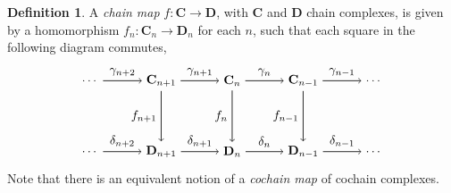 \documentclass[11.5pt, twoside, a4paper, titlepage]{report}
\theoremstyle{definition}
\newtheorem{mydef}{Definition}[section]
\theoremstyle{plain}
\begin{document}
\begin{mydef}
A \emph{chain map}  $f: \mathbf{C} \to \mathbf{D}$, with $\mathbf{C}$ and $\mathbf{D}$ chain complexes, is given by a homomorphism $f_n: \mathbf{C}_n \to \mathbf{D}_n$ for each $n$, such that each square in the following diagram commutes, 
\begin{equation*}
\begin{tikzpicture}[->,-latex, auto, every path/.style={->, semithick}, main node/.style={}]
\node	[main node]		(1) at (0,0)		{\dots};
\node	[main node]		(2) at (2,0)		{$\mathbf{C}_{n+1}$};
\node	[main node]		(3) at (4,0)		{$\mathbf{C}_{n}$};
\node [main node]		(4) at (6,0)		{$\mathbf{C}_{n-1}$};
\node [main node]		(5) at (8,0)		{$\dots$};
\node	[main node]		(6) at (0,-2)		{\dots};
\node	[main node]		(7) at (2,-2)		{$\mathbf{D}_{n+1}$};
\node	[main node]		(8) at (4,-2)		{$\mathbf{D}_{n}$};
\node [main node]		(9) at (6,-2)		{$\mathbf{D}_{n-1}$};
\node [main node]		(10) at (8,-2)		{\dots};

\draw (1) edge node [auto] {$\gamma_{n+2}$} (2);
\draw (2) edge node [auto] {$\gamma_{n+1}$} (3);
\draw (3) edge node [auto] {$\gamma_n$} (4);
\draw (4) edge node [auto] {$\gamma_{n-1}$} (5);
\draw (6) edge node [auto] {$\delta_{n+2}$} (7);
\draw (7) edge node [auto] {$\delta_{n+1}$} (8);
\draw (8) edge node [auto] {$\delta_n$} (9);
\draw (9) edge node [auto] {$\delta_{n-1}$} (10);
\draw (2) edge node [auto, swap] {$f_{n+1}$} (7);
\draw (3) edge node [auto, swap] {$f_n$} (8);
\draw (4) edge node [auto, swap] {$f_{n-1}$} (9);
\end{tikzpicture}
\end{equation*}
Note that there is an equivalent notion of a \emph{cochain map} of cochain complexes.
\end{mydef}
\end{document}
